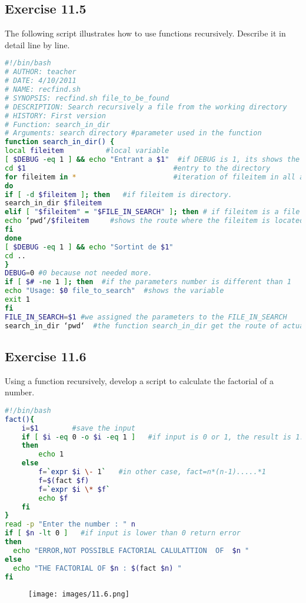 \documentclass[12pt, titlepage,]{article}
\begin{document}
\subsection{Exercise 11.5}
The following script illustrates how to use functions recursively. Describe it in detail line by line.
\begin{lstlisting}[language=Bash]  
#!/bin/bash
# AUTHOR: teacher
# DATE: 4/10/2011
# NAME: recfind.sh
# SYNOPSIS: recfind.sh file_to_be_found
# DESCRIPTION: Search recursively a file from the working directory
# HISTORY: First version
# Function: search_in_dir
# Arguments: search directory #parameter used in the function
function search_in_dir() {
local fileitem          #local variable
[ $DEBUG -eq 1 ] && echo "Entrant a $1"  #if DEBUG is 1, its shows the string indicating the entry in the directory.
cd $1                                   #entry to the directory
for fileitem in *                       #iteration of fileitem in all actual files and directories.
do
if [ -d $fileitem ]; then   #if fileitem is directory.
search_in_dir $fileitem
elif [ "$fileitem" = "$FILE_IN_SEARCH" ]; then # if fileitem is a file which we are looking for.
echo ‘pwd‘/$fileitem     #shows the route where the fileitem is located.
fi
done
[ $DEBUG -eq 1 ] && echo "Sortint de $1"
cd ..
}
DEBUG=0 #0 because not needed more.
if [ $# -ne 1 ]; then  #if the parameters number is different than 1 
echo "Usage: $0 file_to_search"  #shows the variable 
exit 1
fi
FILE_IN_SEARCH=$1 #we assigned the parameters to the FILE_IN_SEARCH 
search_in_dir ‘pwd‘  #the function search_in_dir get the route of actual directory as a parameter
\end{lstlisting}

\subsection{Exercise 11.6}
Using a function recursively, develop a script to calculate the factorial of a number. 
\begin{lstlisting}[language=Bash]
#!/bin/bash
fact(){
    i=$1        #save the input
    if [ $i -eq 0 -o $i -eq 1 ]   #if input is 0 or 1, the result is 1.
    then
        echo 1
    else
        f=`expr $i \- 1`   #in other case, fact=n*(n-1).....*1
        f=$(fact $f)
        f=`expr $i \* $f`
        echo $f
    fi
}
read -p "Enter the number : " n
if [ $n -lt 0 ]   #if input is lower than 0 return error
then
  echo "ERROR,NOT POSSIBLE FACTORIAL CALULATTION  OF  $n "
else
  echo "THE FACTORIAL OF $n : $(fact $n) "
fi
\end{lstlisting}
\begin{figure}[h] %
\centering
{\texttt{[image: images/11.6.png]}}
\end{figure} 
\vspace{34mm}
\end{document}
